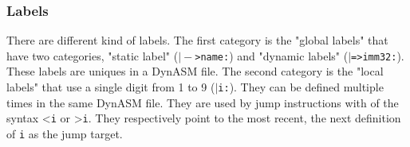 \subsubsection{Labels}
There are different kind of labels. The first category is the "global
labels" that have two categories, "static label" (\texttt{$\vert-$\textgreater name:}) and "dynamic labels" (\texttt{$\vert$=\textgreater imm32:}).
These labels are uniques in a DynASM file. The second category is the "local
labels" that use a single digit from 1 to 9 (\texttt{$\vert$i:}). They can be defined
multiple times in the same DynASM file. They are used by jump instructions with of the syntax \textless \texttt{i} or \textgreater \texttt{i}. They respectively point to
the most recent, the next definition of \texttt{i} as the jump target.
